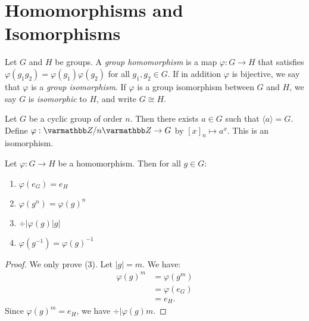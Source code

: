 \section{Homomorphisms and Isomorphisms}
    \begin{definition}
        Let $G$ and $H$ be groups. A \textit{group homomorphism} is a map $\varphi:G \rightarrow H$ that satisfies $\varphi(g_1g_2) = \varphi(g_1)\varphi(g_2)$ for all $g_1,g_2 \in G$. If in addition $\varphi$ is bijective, we say that $\varphi$ is a \textit{group isomorphism}. If $\varphi$ is a group isomorphism between $G$ and $H$, we say $G$ is \textit{isomorphic} to $H$, and write $G \cong H$.
    \end{definition}

    \begin{example}
        Let $G$ be a cyclic group of order $n$. Then there exists $a \in G$ such that $\langle a \rangle = G$. Define $\varphi:\bfZ/n\bfZ \rightarrow G$ by $[x]_n \mapsto a^x$. This is an isomorphism.
    \end{example}

    \begin{proposition}
        Let $\varphi:G \rightarrow H$ be a homomorphism. Then for all $g \in G$:
            \begin{enumerate}[label = (\arabic*),itemsep=1pt,topsep=3pt]
                \item $\varphi(e_G) = e_H$
                \item $\varphi(g^n) = \varphi(g)^n$
                \item $\div{|\varphi(g)}{|g|}$
                \item $\varphi(g^{-1})=\varphi(g)^{-1}$
            \end{enumerate}
    \end{proposition}
        \begin{proof}
            We only prove (3). Let $|g| = m$. We have:
                \begin{equation*}
                \begin{split}
                    \varphi(g)^m 
                    & = \varphi(g^m) \\
                    & = \varphi(e_G) \\
                    & = e_H.
                \end{split}
                \end{equation*}
            Since $\varphi(g)^m = e_H$, we have $\div{|\varphi(g)}{m}$.
        \end{proof}

